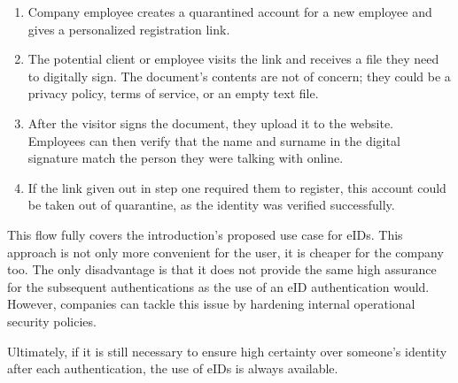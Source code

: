 \begin{enumerate}
    \item Company employee creates a quarantined account for a new employee and gives a personalized registration link.
    \item The potential client or employee visits the link and receives a file they need to digitally sign. The document's contents are not of concern; they could be a privacy policy, terms of service, or an empty text file.
    \item After the visitor signs the document, they upload it to the website. Employees can then verify that the name and surname in the digital signature match the person they were talking with online.
    \item If the link given out in step one required them to register, this account could be taken out of quarantine, as the identity was verified successfully.
\end{enumerate}

This flow fully covers the introduction's proposed use case for eIDs. This approach is not only more convenient for the user, it is cheaper for the company too. The only disadvantage is that it does not provide the same high assurance for the subsequent authentications as the use of an eID authentication would. However, companies can tackle this issue by hardening internal operational security policies.

Ultimately, if it is still necessary to ensure high certainty over someone's identity after each authentication, the use of eIDs is always available.